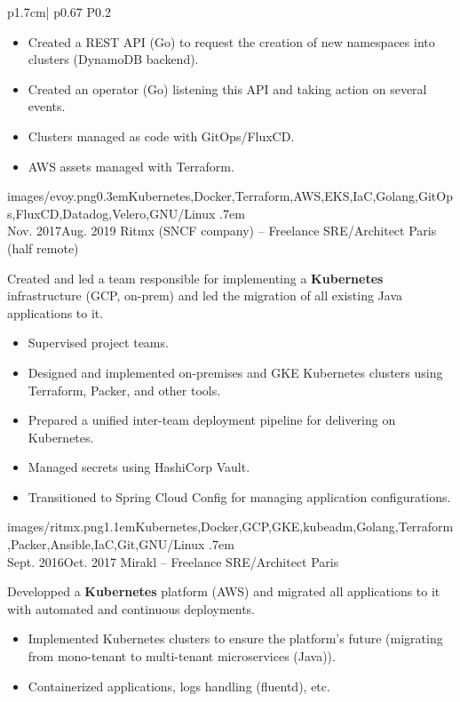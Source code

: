 \begin{longtable}{p{1.7cm}| p{} P{0.2\textwidth}}
{\begin{itemize}
        \item Created a REST API (Go) to request the creation of new namespaces into clusters (DynamoDB backend).
        \item Created an operator (Go) listening this API and taking action on several events.
        \item Clusters managed as code with GitOps/FluxCD.
        \item AWS assets managed with Terraform.
      \end{itemize}
    }
    {images/evoy.png}{0.3em}{Kubernetes,Docker,Terraform,AWS,EKS,IaC,Golang,GitOps,FluxCD,Datadog,Velero,GNU/Linux}
    {.7em} \\
  \cveventdetailed
    {Nov. 2017\newline Aug. 2019}
    {Ritmx (SNCF company) -- Freelance}
    {SRE/Architect}
    {Paris (half remote)\color{cvred}}
    {
      Created and led a team responsible for implementing a {\bfseries Kubernetes} infrastructure (GCP, on-prem) and led the migration of all existing Java applications to it.
      \begin{itemize}
        \item Supervised project teams.
        \item Designed and implemented on-premises and GKE Kubernetes clusters using Terraform, Packer, and other tools.
        \item Prepared a unified inter-team deployment pipeline for delivering on Kubernetes.
        \item Managed secrets using HashiCorp Vault.
        \item Transitioned to Spring Cloud Config for managing application configurations.
      \end{itemize}
    }
    {images/ritmx.png}{1.1em}{Kubernetes,Docker,GCP,GKE,kubeadm,Golang,Terraform,Packer,Ansible,IaC,Git,GNU/Linux}
    {.7em} \\
  \cveventdetailed
    {Sept. 2016\newline Oct. 2017}
    {Mirakl -- Freelance}
    {SRE/Architect}
    {Paris\color{cvred}}
    {
      Developped a {\bfseries Kubernetes} platform (AWS) and migrated all applications to it with automated and continuous deployments.
      \begin{itemize}
        \item Implemented Kubernetes clusters to ensure the platform's future (migrating from mono-tenant to multi-tenant microservices (Java)).
        \item Containerized applications, logs handling (fluentd), etc.

\end{itemize}}
\end{longtable}
